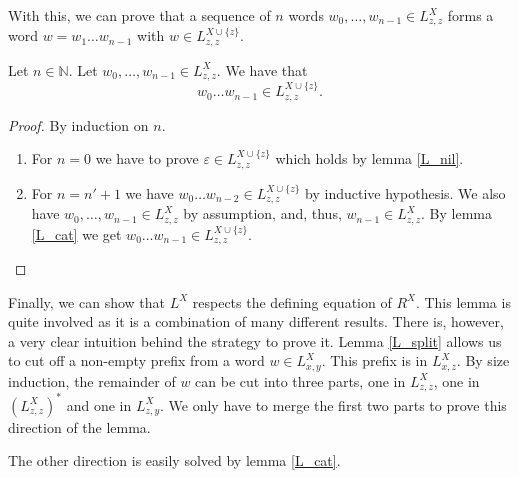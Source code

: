 
With this, we can prove that a sequence of $n$ words $w_0, \ldots, w_{n-1} \in L^{X}_{z,z}$ 
forms a word $w = w_1 \ldots w_{n-1}$ with $w \in L^{X\cup\{z\}}_{z,z}$.

\begin{lemma}
    \label{L_flatten}
    Let $n \in \mathbb{N}$. Let $w_0, \ldots, w_{n-1} \in L^{X}_{z,z}$.
    We have that
    \begin{equation*}
        w_0 \ldots w_{n-1} \in L^{X\cup\{z\}}_{z,z}.
    \end{equation*}
\end{lemma}
\begin{proof}
    By induction on $n$.
    \begin{enumerate}
        \item For $n = 0$ we have to prove $\varepsilon \in L^{X\cup\{z\}}_{z,z}$ which holds by lemma \ref{L_nil}.
        \item For $n = n'+1$ we have $w_0 \ldots w_{n-2} \in L^{X\cup\{z\}}_{z,z}$ by inductive hypothesis.
            We also have $w_0, \ldots, w_{n-1} \in L^{X}_{z,z}$ by assumption, and, thus, $w_{n-1} \in L^{X}_{z,z}$.
            By lemma \ref{L_cat} we get $w_0 \ldots w_{n-1} \in L^{X\cup\{z\}}_{z,z}$.
    \end{enumerate}
\end{proof}

Finally, we can show that $L^X$ respects the defining equation of $R^X$.
This lemma is quite involved as it is a combination of many different results.
There is, however, a very clear intuition behind the strategy to prove it.
Lemma \ref{L_split} allows us to cut off a non-empty prefix from a word $w \in L^{X}_{x,y}$.
This prefix is in $L^{X}_{x,z}$. 
By size induction, the remainder of $w$ can be cut into three parts, 
one in $L^{X}_{z,z}$, one in $(L^{X}_{z,z})^*$ and one in $L^{X}_{z,y}$. 
We only have to merge the first two parts to prove this direction of the lemma.

The other direction is easily solved by lemma \ref{L_cat}.


